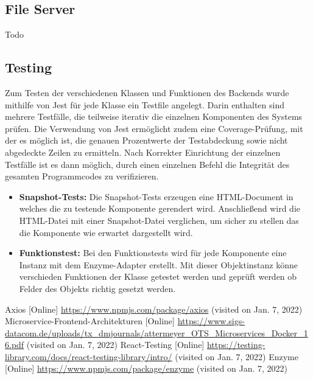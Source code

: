 \documentclass[conference]{IEEEtran}
\begin{document}
\subsection{File Server}
Todo

\subsection{Testing}
Zum Testen der verschiedenen Klassen und Funktionen des Backends wurde mithilfe von Jest für jede Klasse ein Testfile angelegt. Darin enthalten sind mehrere Testfälle, die teilweise iterativ die einzelnen Komponenten des Systems prüfen. Die Verwendung von Jest ermöglicht zudem eine Coverage-Prüfung, mit der es möglich ist, die genauen Prozentwerte der Testabdeckung sowie nicht abgedeckte Zeilen zu ermitteln. Nach Korrekter Einrichtung der einzelnen Testfälle ist es dann möglich, durch einen einzelnen Befehl die Integrität des gesamten Programmcodes zu verifizieren.

\begin{itemize}
    \item \textbf{Snapshot-Tests:}
    Die Snapshot-Tests erzeugen eine HTML-Document in welches die zu testende Komponente gerendert wird.
    Anschließend wird die HTML-Datei mit einer Snapshot-Datei verglichen, um sicher zu stellen das die Komponente wie erwartet dargestellt wird.
    \item \textbf{Funktionstest:}
    Bei den Funktionstests wird für jede Komponente eine Instanz mit dem Enzyme-Adapter erstellt.
    Mit dieser Objektinstanz könne verschieden Funktionen der Klasse getestet werden und geprüft werden ob Felder des Objekts richtig gesetzt werden.
\end{itemize}



\begin{thebibliography}{0}
	Axios [Online] \url{https://www.npmjs.com/package/axios} (visited on Jan. 7, 2022)
    Microservice-Frontend-Architekturen [Online] \url{https://www.sigs-datacom.de/uploads/tx_dmjournals/attermeyer_OTS_Microservices_Docker_16.pdf} (visited on Jan. 7, 2022)
    React-Testing [Online] \url{https://testing-library.com/docs/react-testing-library/intro/} (visited on Jan. 7, 2022)
    Enzyme [Online] \url{https://www.npmjs.com/package/enzyme} (visited on Jan. 7, 2022)  
\end{thebibliography}
\end{document}
